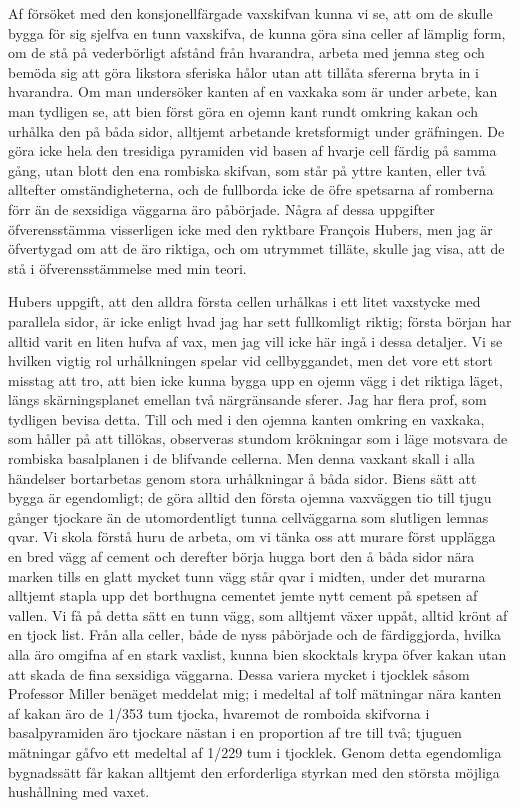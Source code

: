 Af försöket med den konsjonellfärgade vaxskifvan kunna vi se, att om de skulle bygga för sig sjelfva en tunn vaxskifva, de kunna göra sina celler af lämplig form, om de stå på vederbörligt afstånd från hvarandra, arbeta med jemna steg och bemöda sig att göra likstora sferiska hålor utan att tillåta sfererna bryta in i hvarandra. Om man undersöker kanten af en vaxkaka som är under arbete, kan man tydligen se, att bien först göra en ojemn kant rundt omkring kakan och urhålka den på båda sidor, alltjemt arbetande kretsformigt under gräfningen. De göra icke hela den tresidiga pyramiden vid basen af hvarje cell färdig på samma gång, utan blott den ena rombiska skifvan, som står på yttre kanten, eller två alltefter omständigheterna, och de fullborda icke de öfre spetsarna af romberna förr än de sexsidiga väggarna äro påbörjade. Några af dessa uppgifter öfverensstämma visserligen icke med den ryktbare François Hubers, men jag är öfvertygad om att de äro riktiga, och om utrymmet tilläte, skulle jag visa, att de stå i öfverensstämmelse med min teori.

Hubers uppgift, att den alldra första cellen urhålkas i ett litet vaxstycke med parallela sidor, är icke enligt hvad jag har sett fullkomligt riktig; första början har alltid varit en liten hufva af vax, men jag vill icke här ingå i dessa detaljer. Vi se hvilken vigtig rol urhålkningen spelar vid cellbyggandet, men det vore ett stort misstag att tro, att bien icke kunna bygga upp en ojemn vägg i det riktiga läget, längs skärningsplanet emellan två närgränsande sferer. Jag har flera prof, som tydligen bevisa detta. Till och med i den ojemna kanten omkring en vaxkaka, som håller på att tillökas, observeras stundom krökningar som i läge motsvara de rombiska basalplanen i de blifvande cellerna. Men denna vaxkant skall i alla händelser bortarbetas genom stora urhålkningar å båda sidor. Biens sätt att bygga är egendomligt; de göra alltid den första ojemna vaxväggen tio till tjugu gånger tjockare än de utomordentligt tunna cellväggarna som slutligen lemnas qvar. Vi skola förstå huru de arbeta, om vi tänka oss att murare först upplägga en bred vägg af cement och derefter börja hugga bort den å båda sidor nära marken tills en glatt mycket tunn vägg står qvar i midten, under det murarna alltjemt stapla upp det borthugna cementet jemte nytt cement på spetsen af vallen. Vi få på detta sätt en tunn vägg, som alltjemt växer uppåt, alltid krönt af en tjock list. Från alla celler, både de nyss påbörjade och de färdiggjorda, hvilka alla äro omgifna af en stark vaxlist, kunna bien skocktals krypa öfver kakan utan att skada de fina sexsidiga väggarna. Dessa variera mycket i tjocklek såsom Professor Miller benäget meddelat mig; i medeltal af tolf mätningar nära kanten af kakan äro de 1/353 tum tjocka, hvaremot de romboida skifvorna i basalpyramiden äro tjockare nästan i en proportion af tre till två; tjuguen mätningar gåfvo ett medeltal af 1/229 tum i tjocklek. Genom detta egendomliga bygnadssätt får kakan alltjemt den erforderliga styrkan med den största möjliga hushållning med vaxet.

